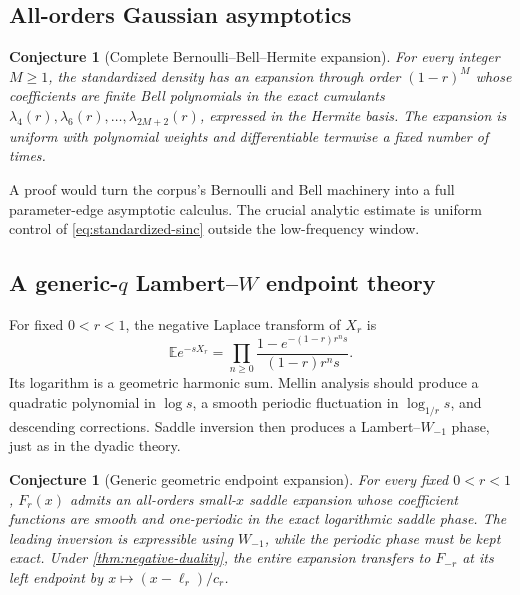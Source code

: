 \documentclass[11pt]{article}
\newtheorem{conjecture}[theorem]{Conjecture}
\theoremstyle{definition}
\newcommand{\E}{\mathbb E}
\begin{document}
\subsection{All-orders Gaussian asymptotics}

\begin{conjecture}[Complete Bernoulli--Bell--Hermite expansion]\label{conj:all-orders}
For every integer \(M\ge1\), the standardized density has an expansion through order
\((1-r)^M\) whose coefficients are finite Bell polynomials in the exact cumulants
\(\lambda_4(r),\lambda_6(r),\ldots,\lambda_{2M+2}(r)\), expressed in the Hermite basis.
The expansion is uniform with polynomial weights and differentiable termwise a fixed
number of times.
\end{conjecture}

A proof would turn the corpus's Bernoulli and Bell machinery into a full parameter-edge
asymptotic calculus.  The crucial analytic estimate is uniform control of
\cref{eq:standardized-sinc} outside the low-frequency window.

\subsection{A generic-$q$ Lambert--\texorpdfstring{$W$}{W} endpoint theory}

For fixed \(0<r<1\), the negative Laplace transform of \(X_r\) is
\begin{equation}
 \E e^{-sX_r}
 =\prod_{n\ge0}
 \frac{1-e^{-(1-r)r^ns}}{(1-r)r^ns}.                      \label{eq:general-laplace-product}
\end{equation}
Its logarithm is a geometric harmonic sum.  Mellin analysis should produce a quadratic
polynomial in \(\log s\), a smooth periodic fluctuation in
\(\log_{1/r}s\), and descending corrections.  Saddle inversion then produces a
Lambert--\(W_{-1}\) phase, just as in the dyadic theory.

\begin{conjecture}[Generic geometric endpoint expansion]\label{conj:generic-endpoint}
For every fixed \(0<r<1\), \(F_r(x)\) admits an all-orders small-\(x\) saddle expansion
whose coefficient functions are smooth and one-periodic in the exact logarithmic saddle
phase.  The leading inversion is expressible using \(W_{-1}\), while the periodic phase
must be kept exact.  Under \cref{thm:negative-duality}, the entire expansion transfers to
\(F_{-r}\) at its left endpoint by \(x\mapsto(x-\ell_r)/c_r\).
\end{conjecture}
\end{document}
